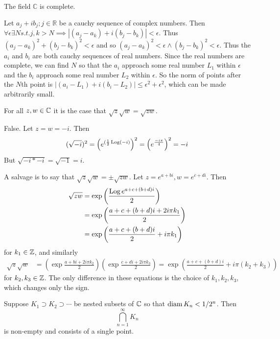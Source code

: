 \documentclass{homework}
\begin{document}
\begin{problem}\label{C-complete} %
  The field $\mathbb{C}$ is complete.
\end{problem}
\begin{solution}
Let $a_j + ib_j;j\in \mathbb{R}$ be a cauchy sequence of complex numbers. Then $\forall \epsilon \exists N s.t. j, k > N \implies |(a_j - a_k) + i(b_j - b_k)| < \epsilon.$ Thus 
$(a_j-a_k)^2 + (b_j - b_k)^2 < \epsilon$
and so
$(a_j-a_k)^2 < \epsilon \land (b_j - b_k)^2 < \epsilon.$
Thus the $a_i$ and $b_i$ are both cauchy sequences of real numbers. Since the real numbers are complete, we can find $N$ so that the $a_i$ approach some real number $L_1$ within $\epsilon$ and the $b_i$ approach some real number $L_2$ within $\epsilon$. So the norm of points after the $N$th point is $|(a_i - L_1) + i(b_i-L_2)| \leq \epsilon^2 + \epsilon^2$, which can be made arbitrarily small.
\end{solution}
\begin{problem}
 For all $z, w \in \mathbb{C}$ it is the case that $\sqrt{z} \sqrt{w} = \sqrt{zw}$.
\end{problem}
\begin{solution}
False. Let $z=w=-i$. Then 
\[(\sqrt{-i})^2 = \left(e^{(\frac{1}{2}\operatorname{Log}(-i)}\right)^2 = \left(e^{\frac{-i\pi}{4}}\right)^2 = -i\]
But $\sqrt{-i*-i} = \sqrt{-1} = i$.

A salvage is to say that $\sqrt{z} \sqrt{w} = \pm\sqrt{zw}.$ Let $z=e^{a+bi}, w=e^{c+di}$. Then
\begin{align*}
\sqrt{zw} &= \exp\left(\frac{\operatorname{Log} e^{a+c+(b+d)i}}{2}\right)\\
&= \exp\left(\frac{a+c + (b+d)i + 2i\pi k_1}{2}\right)\\
&= \exp\left(\frac{a+c + (b+d)i}{2} + i\pi k_1\right)\\
\end{align*}
for $k_1\in\mathbb{Z}$, and similarly
\begin{align*}
\sqrt{z}\sqrt{w} &= (\exp\frac{a+bi + 2i\pi k_2}{2})(\exp\frac{c+di + 2i\pi k_3}{2}) = \exp\left(\frac{a+c + (b+d)i}{2} + i\pi (k_2 + k_3)\right)
\end{align*}
for $k_2, k_3 \in \mathbb{Z}$. The only difference in these equations is the choice of $k_1,k_2,k_3$, which changes only the sign.
\end{solution}
\begin{problem} %
  Suppose $K_1 \supset K_2 \supset \cdots$ be nested subsets of $\mathbb{C}$ so that $\operatorname{diam} K_n < 1/2^n$.  Then
  \[
    \bigcap_{n=1}^\infty K_n
  \]
  is non-empty and consists of a single point.
\end{problem}
\end{document}
